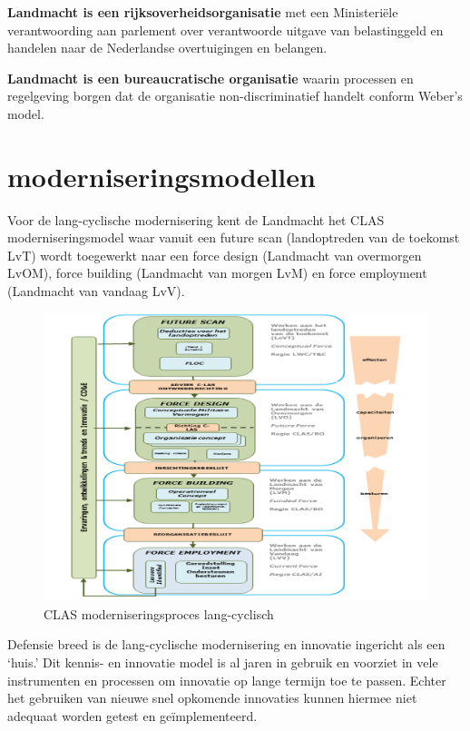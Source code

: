 \documentclass[
]{book}
\begin{document}
\textbf{Landmacht is een rijksoverheidsorganisatie}
met een Ministeriële verantwoording aan parlement over verantwoorde uitgave van belastinggeld en handelen naar de Nederlandse overtuigingen en belangen.

\textbf{Landmacht is een bureaucratische organisatie}
waarin processen en regelgeving borgen dat de organisatie non-discriminatief handelt conform Weber's model.

\hypertarget{moderniseringsmodellen}{%
\section{moderniseringsmodellen}\label{moderniseringsmodellen}}

Voor de lang-cyclische modernisering kent de Landmacht het CLAS moderniseringsmodel waar vanuit een future scan (landoptreden van de toekomst LvT) wordt toegewerkt naar een force design (Landmacht van overmorgen LvOM), force building (Landmacht van morgen LvM) en force employment (Landmacht van vandaag LvV).

\begin{figure}
\includegraphics[width=14.29in]{data/images/BO-2016-CLAS-moderniseringsmodel} \caption{CLAS moderniseringsproces lang-cyclisch }\label{fig:unnamed-chunk-4}
\end{figure}

Defensie breed is de lang-cyclische modernisering en innovatie ingericht als een `huis.' Dit kennis- en innovatie model is al jaren in gebruik en voorziet in vele instrumenten en processen om innovatie op lange termijn toe te passen. Echter het gebruiken van nieuwe snel opkomende innovaties kunnen hiermee niet adequaat worden getest en geïmplementeerd.
\end{document}
